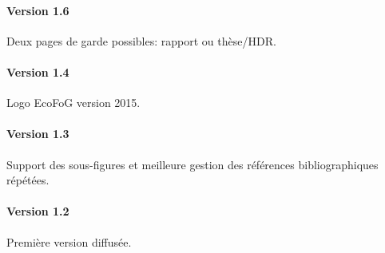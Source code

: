\documentclass[
  a4paper, %
  11pt, extrafontsizes, %
  onecolumn, %
  openright, %
]{memoir}
\begin{document}
\paragraph{Version 1.6}
Deux pages de garde possibles: rapport ou thèse/HDR.

\paragraph{Version 1.4}
Logo EcoFoG version 2015.

\paragraph{Version 1.3}
Support des sous-figures et meilleure gestion des références bibliographiques répétées.

\paragraph{Version 1.2}
Première version diffusée.

\backmatter
\clearpage


\SmallMargins


\printbibliography

\evenpage
 
\end{document}
